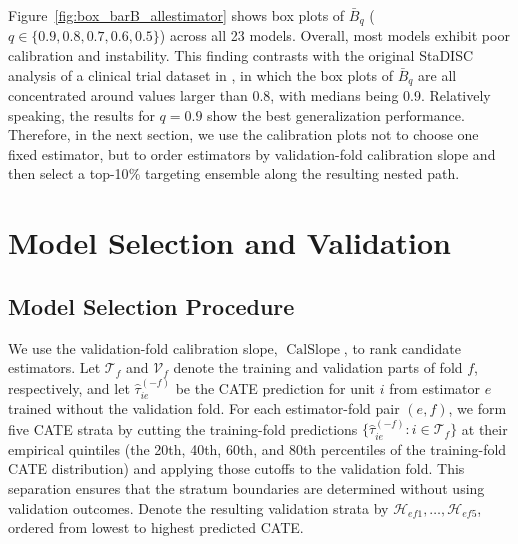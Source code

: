 \documentclass[12pt]{article}
\newcommand{\TargetFrac}{10{\%}\xspace}
\newcommand{\CalSlope}{\ensuremath{\operatorname{CalSlope}}}
\begin{document}
Figure~\ref{fig:box_barB_allestimator} shows box plots of $\bar{B}_{q}$ ($q \in \{0.9,0.8,0.7,0.6,0.5\}$) across all 23 models. Overall, most models exhibit poor calibration and instability. This finding contrasts with the original StaDISC analysis of a clinical trial dataset in \cite{dwivedi2020}, in which the box plots of $\bar{B}_{q}$ are all concentrated around values larger than 0.8, with medians being 0.9. Relatively speaking, the results for $q=0.9$ show the best generalization performance. Therefore, in the next section, we use the calibration plots not to choose one fixed estimator, but to order estimators by validation-fold calibration slope and then select a top-\TargetFrac targeting ensemble along the resulting nested path.

\begingroup{}

\endgroup

\section{Model Selection and Validation}
\label{sec:model_selection}
\label{sec:stability_ranking}

\subsection{Model Selection Procedure}

We use the validation-fold calibration slope, $\CalSlope$, to rank candidate estimators. Let $\mathcal{T}_f$ and $\mathcal{V}_f$ denote the training and validation parts of fold $f$, respectively, and let $\widehat{\tau}_{ie}^{(-f)}$ be the CATE prediction for unit $i$ from estimator $e$ trained without the validation fold. For each estimator-fold pair $(e,f)$, we form five CATE strata by cutting the training-fold predictions $\{\widehat{\tau}_{ie}^{(-f)}:i\in\mathcal{T}_f\}$ at their empirical quintiles (the 20th, 40th, 60th, and 80th percentiles of the training-fold CATE distribution) and applying those cutoffs to the validation fold. This separation ensures that the stratum boundaries are determined without using validation outcomes. Denote the resulting validation strata by $\mathcal{H}_{ef1},\ldots,\mathcal{H}_{ef5}$, ordered from lowest to highest predicted CATE.
\end{document}
